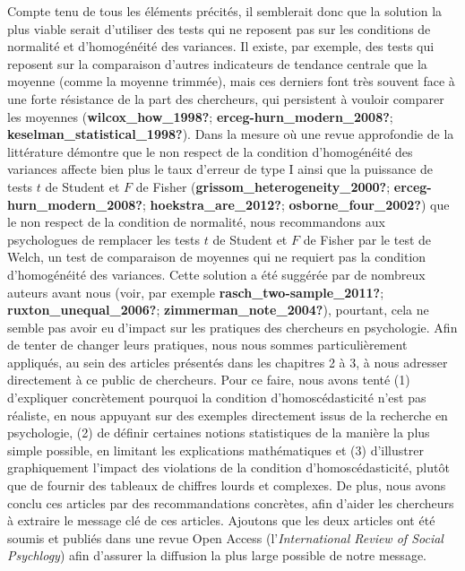 \documentclass[
  english,
  man]{apa6}
\begin{document}
Compte tenu de tous les éléments précités, il semblerait donc que la solution la plus viable serait d'utiliser des tests qui ne reposent pas sur les conditions de normalité et d'homogénéité des variances. Il existe, par exemple, des tests qui reposent sur la comparaison d'autres indicateurs de tendance centrale que la moyenne (comme la moyenne trimmée), mais ces derniers font très souvent face à une forte résistance de la part des chercheurs, qui persistent à vouloir comparer les moyennes (\textbf{wilcox\_how\_1998?}; \textbf{erceg-hurn\_modern\_2008?}; \textbf{keselman\_statistical\_1998?}). Dans la mesure où une revue approfondie de la littérature démontre que le non respect de la condition d'homogénéité des variances affecte bien plus le taux d'erreur de type I ainsi que la puissance de tests \(t\) de Student et \(F\) de Fisher (\textbf{grissom\_heterogeneity\_2000?}; \textbf{erceg-hurn\_modern\_2008?}; \textbf{hoekstra\_are\_2012?}; \textbf{osborne\_four\_2002?}) que le non respect de la condition de normalité, nous recommandons aux psychologues de remplacer les tests \(t\) de Student et \(F\) de Fisher par le test de Welch, un test de comparaison de moyennes qui ne requiert pas la condition d'homogénéité des variances. Cette solution a été suggérée par de nombreux auteurs avant nous (voir, par exemple \textbf{rasch\_two-sample\_2011?}; \textbf{ruxton\_unequal\_2006?}; \textbf{zimmerman\_note\_2004?}), pourtant, cela ne semble pas avoir eu d'impact sur les pratiques des chercheurs en psychologie. Afin de tenter de changer leurs pratiques, nous nous sommes particulièrement appliqués, au sein des articles présentés dans les chapitres 2 à 3, à nous adresser directement à ce public de chercheurs. Pour ce faire, nous avons tenté (1) d'expliquer concrètement pourquoi la condition d'homoscédasticité n'est pas réaliste, en nous appuyant sur des exemples directement issus de la recherche en psychologie, (2) de définir certaines notions statistiques de la manière la plus simple possible, en limitant les explications mathématiques et (3) d'illustrer graphiquement l'impact des violations de la condition d'homoscédasticité, plutôt que de fournir des tableaux de chiffres lourds et complexes. De plus, nous avons conclu ces articles par des recommandations concrètes, afin d'aider les chercheurs à extraire le message clé de ces articles. Ajoutons que les deux articles ont été soumis et publiés dans une revue Open Access (l'\emph{International Review of Social Psychlogy}) afin d'assurer la diffusion la plus large possible de notre message.
\end{document}
